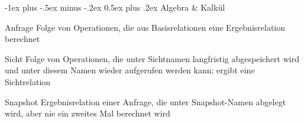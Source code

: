 \documentclass[a4paper]{article}
\makeatletter
\renewcommand{\section}{\@startsection{section}{1}{0mm}%
                                {-1ex plus -.5ex minus -.2ex}%
                                {0.5ex plus .2ex}%
                                {\normalfont\large\bfseries}}
\makeatother
\begin{document}
\begin{multicols}{3}
    \section{Algebra \& Kalkül}
    \begin{description*}
        \item[Anfrage] Folge von Operationen, die aus Basisrelationen eine Ergebnisrelation berechnet
        \item[Sicht] Folge von Operationen, die unter Sichtnamen langfristig abgespeichert wird und unter diesem Namen wieder aufgerufen werden kann; ergibt eine Sichtrelation
        \item[Snapshot] Ergebnisrelation einer Anfrage, die unter Snapshot-Namen abgelegt wird, aber nie ein zweites Mal berechnet wird
    \end{description*}


\end{multicols}
\end{document}
